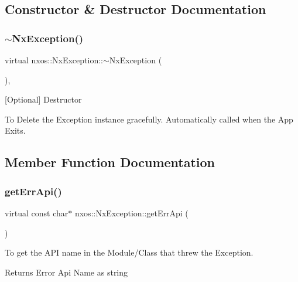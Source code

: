 \subsection{Constructor \& Destructor Documentation}
\mbox{\label{classnxos_1_1_nx_exception_a2063f2937b4fdfe7a2e58f0ce727d70c}} 
\subsubsection{\texorpdfstring{$\sim$\+Nx\+Exception()}{~NxException()}}
{\footnotesize\ttfamily virtual nxos\+::\+Nx\+Exception\+::$\sim$\+Nx\+Exception (\begin{DoxyParamCaption}{ }\end{DoxyParamCaption})\hspace{0.3cm}{\ttfamily [inline]}, {\ttfamily [virtual]}}

\mbox{[}Optional\mbox{]} Destructor

To Delete the Exception instance gracefully. Automatically called when the App Exits. 

\subsection{Member Function Documentation}
\mbox{\label{classnxos_1_1_nx_exception_a82ce0a75c61b55ca191c86e5abfeaa20}} 
\subsubsection{\texorpdfstring{get\+Err\+Api()}{getErrApi()}}
{\footnotesize\ttfamily virtual const char$\ast$ nxos\+::\+Nx\+Exception\+::get\+Err\+Api (\begin{DoxyParamCaption}{ }\end{DoxyParamCaption})\hspace{0.3cm}{\ttfamily [pure virtual]}}

To get the A\+PI name in the Module/\+Class that threw the Exception.

\begin{DoxyReturn}{Returns}
Error Api Name as string 
\end{DoxyReturn}
\mbox{\label{classnxos_1_1_nx_exception_ace42c480c5b1efc0779028339a09f067}} 
